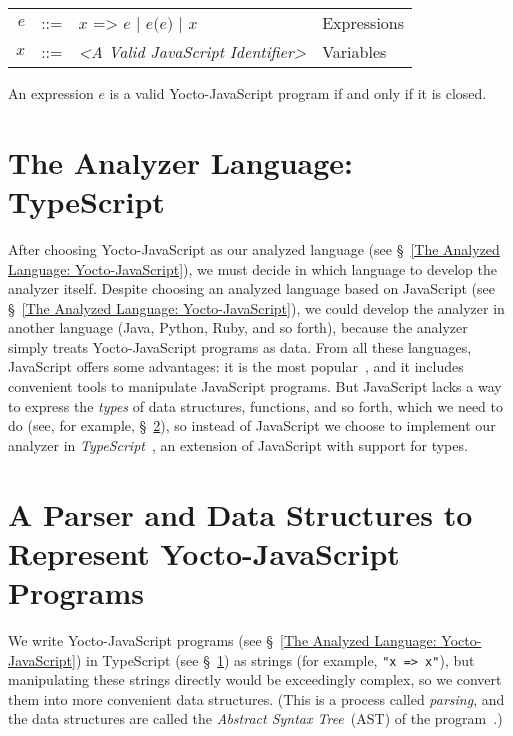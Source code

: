 \documentclass[12pt, oneside]{book}
\begin{document}
\begin{center}
\begin{tabular}{rcll}
$e$ & ::= & $x\texttt{ => }e$ | $e\texttt{(}e\texttt{)}$ | $x$ & Expressions \\
$x$ & ::= & \emph{<A Valid JavaScript Identifier>} & Variables \\
\end{tabular}
\end{center}

An expression $e$ is a valid Yocto-JavaScript program if and only if it is closed.

\section{The Analyzer Language: TypeScript}
\label{The Analyzer Language: TypeScript}

After choosing Yocto-JavaScript as our analyzed language (see §~\ref{The Analyzed Language: Yocto-JavaScript}), we must decide in which language to develop the analyzer itself. Despite choosing an analyzed language based on JavaScript (see §~\ref{The Analyzed Language: Yocto-JavaScript}), we could develop the analyzer in another language (Java, Python, Ruby, and so forth), because the analyzer simply treats Yocto-JavaScript programs as data. From all these languages, JavaScript offers some advantages: it is the most popular~\cite{stack-overflow-developer-survey, jet-brains-developer-survey}, and it includes convenient tools to manipulate JavaScript programs. But JavaScript lacks a way to express the \emph{types} of data structures, functions, and so forth, which we need to do (see, for example, §~\ref{A Parser and Data Structures to Represent Yocto-JavaScript Programs}), so instead of JavaScript we choose to implement our analyzer in \emph{TypeScript}~\cite{typescript, typescript-deep-dive, understanding-typescript}, an extension of JavaScript with support for types.

\section{A Parser and Data Structures to Represent Yocto-JavaScript Programs}
\label{A Parser and Data Structures to Represent Yocto-JavaScript Programs}

We write Yocto-JavaScript programs (see §~\ref{The Analyzed Language: Yocto-JavaScript}) in TypeScript (see §~\ref{The Analyzer Language: TypeScript}) as strings (for example, \texttt{"x => x"}), but manipulating these strings directly would be exceedingly complex, so we convert them into more convenient data structures. (This is a process called \emph{parsing}, and the data structures are called the \emph{Abstract Syntax Tree}~(AST) of the program~\cite[§~4]{dragon-book}.)
\end{document}
